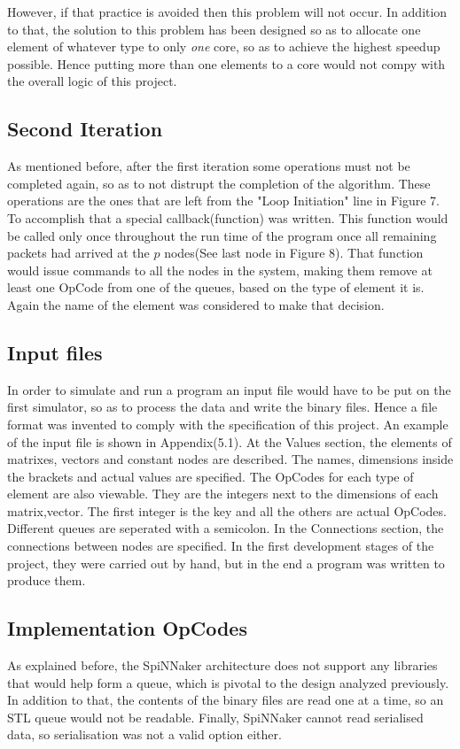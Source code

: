 \documentclass[12pt,a4paper]{article}
\begin{document}
However, if that practice is avoided then this problem will not occur. In addition to that, the solution to this problem has been designed so as to allocate one element of whatever type to only \emph{one} core, so as to achieve the highest speedup possible. Hence putting more than one elements to a core would not compy with the overall logic of this project.
\subsection{Second Iteration}
As mentioned before, after the first iteration some operations must not be completed again, so as to not distrupt the completion of the algorithm. These operations are the ones that are left from the "Loop Initiation" line in Figure 7. To accomplish that a special callback(function) was written. This function would be called only once throughout the run time of the program once all remaining packets had arrived at the $p$ nodes(See last node in Figure 8). That function would issue commands to all the nodes in the system, making them remove at least one OpCode from one of the queues, based on the type of element it is. Again the name of the element was considered to make that decision.
\subsection{Input files}
In order to simulate and run a program an input file would have to be put on the first simulator, so as to process the data and write the binary files. Hence a file format was invented to comply with the specification of this project. An example of the input file is shown in Appendix(5.1). At the Values section, the elements of matrixes, vectors and constant nodes are described. The names, dimensions inside the brackets and actual values are specified. The OpCodes for each type of element are also viewable. They are the integers next to the dimensions of each matrix,vector. The first integer is the key and all the others are actual OpCodes. Different queues are seperated with a semicolon. In the Connections section, the connections between nodes are specified. In the first development stages of the project, they were carried out by hand, but in the end a program was written to produce them.
\subsection{Implementation OpCodes}
As explained before, the SpiNNaker architecture does not support any libraries that would help form a queue, which is pivotal to the design analyzed previously. In addition to that, the contents of the binary files are read one at a time, so an STL queue would not be readable. Finally, SpiNNaker cannot read serialised data, so serialisation was not a valid option either.
\end{document}

